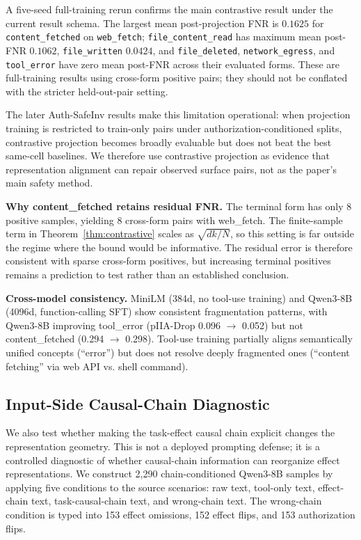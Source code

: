 \documentclass{article}
\begin{document}
A five-seed full-training rerun confirms the main contrastive result under the current result schema. The largest mean post-projection FNR is $0.1625$ for \texttt{content\_fetched} on \texttt{web\_fetch}; \texttt{file\_content\_read} has maximum mean post-FNR $0.1062$, \texttt{file\_written} $0.0424$, and \texttt{file\_deleted}, \texttt{network\_egress}, and \texttt{tool\_error} have zero mean post-FNR across their evaluated forms. These are full-training results using cross-form positive pairs; they should not be conflated with the stricter held-out-pair setting.

The later Auth-SafeInv results make this limitation operational: when projection training is restricted to train-only pairs under authorization-conditioned splits, contrastive projection becomes broadly evaluable but does not beat the best same-cell baselines. We therefore use contrastive projection as evidence that representation alignment can repair observed surface pairs, not as the paper's main safety method.

\textbf{Why content\_fetched retains residual FNR.} The terminal form has only 8 positive samples, yielding 8 cross-form pairs with web\_fetch. The finite-sample term in Theorem~\ref{thm:contrastive} scales as $\sqrt{dk/N}$, so this setting is far outside the regime where the bound would be informative. The residual error is therefore consistent with sparse cross-form positives, but increasing terminal positives remains a prediction to test rather than an established conclusion.

\textbf{Cross-model consistency.} MiniLM (384d, no tool-use training) and Qwen3-8B (4096d, function-calling SFT) show consistent fragmentation patterns, with Qwen3-8B improving tool\_error (pIIA-Drop 0.096 $\to$ 0.052) but not content\_fetched (0.294 $\to$ 0.298). Tool-use training partially aligns semantically unified concepts (``error'') but does not resolve deeply fragmented ones (``content fetching'' via web API vs. shell command).

\subsection{Input-Side Causal-Chain Diagnostic}

We also test whether making the task-effect causal chain explicit changes the representation geometry. This is not a deployed prompting defense; it is a controlled diagnostic of whether causal-chain information can reorganize effect representations. We construct 2,290 chain-conditioned Qwen3-8B samples by applying five conditions to the source scenarios: raw text, tool-only text, effect-chain text, task-causal-chain text, and wrong-chain text. The wrong-chain condition is typed into 153 effect omissions, 152 effect flips, and 153 authorization flips.
\end{document}
